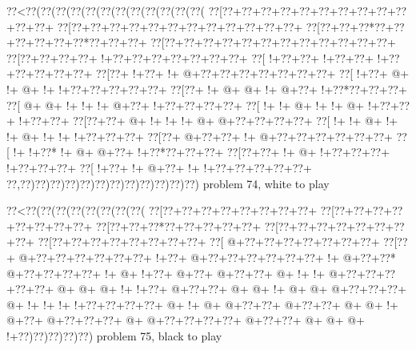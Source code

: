 \vbox{\vbox{\goo
\0??<\0??(\0??(\0??(\0??(\0??(\0??(\0??(\0??(\0??(\0??(\0??(\0??(
\0??[\0??+\0??+\0??+\0??+\0??+\0??+\0??+\0??+\0??+\0??+\0??+\0??+
\0??[\0??+\0??+\0??+\0??+\0??+\0??+\0??+\0??+\0??+\0??+\0??+\0??+
\0??[\0??+\0??+\0??*\0??+\0??+\0??+\0??+\0??+\0??*\0??+\0??+\0??+
\0??[\0??+\0??+\0??+\0??+\0??+\0??+\0??+\0??+\0??+\0??+\0??+\0??+
\0??[\0??+\0??+\0??+\0??+\- !+\0??+\0??+\0??+\0??+\0??+\0??+\0??+
\0??[\- !+\0??+\0??+\- !+\0??+\0??+\- !+\0??+\0??+\0??+\0??+\0??+
\0??[\0??+\- !+\0??+\- !+\- @+\0??+\0??+\0??+\0??+\0??+\0??+\0??+
\0??[\- !+\0??+\- @+\- !+\- @+\- !+\- !+\0??+\0??+\0??+\0??+\0??+
\0??[\0??+\- !+\- @+\- @+\- !+\- @+\0??+\- !+\0??*\0??+\0??+\0??+
\0??[\- @+\- @+\- !+\- !+\- !+\- @+\0??+\- !+\0??+\0??+\0??+\0??+
\0??[\- !+\- !+\- @+\- !+\- !+\- @+\- !+\0??+\0??+\- !+\0??+\0??+
\0??[\0??+\0??+\- @+\- !+\- !+\- !+\- @+\- @+\0??+\0??+\0??+\0??+
\0??[\- !+\- !+\- @+\- !+\- !+\- @+\- !+\- !+\- !+\0??+\0??+\0??+
\0??[\0??+\- @+\0??+\0??+\- !+\- @+\0??+\0??+\0??+\0??+\0??+\0??+
\0??[\- !+\- !+\0??*\- !+\- @+\- @+\0??+\- !+\0??*\0??+\0??+\0??+
\0??[\0??+\0??+\- !+\- @+\- !+\0??+\0??+\0??+\- !+\0??+\0??+\0??+
\0??[\- !+\0??+\- !+\- @+\0??+\- !+\- !+\0??+\0??+\0??+\0??+\0??+
\0??,\0??)\0??)\0??)\0??)\0??)\0??)\0??)\0??)\0??)\0??)\0??)\0??)
}
\hfil problem 74, white to play\hfil\break
}

\vbox{\vbox{\goo
\0??<\0??(\0??(\0??(\0??(\0??(\0??(\0??(\0??(
\0??[\0??+\0??+\0??+\0??+\0??+\0??+\0??+\0??+
\0??[\0??+\0??+\0??+\0??+\0??+\0??+\0??+\0??+
\0??[\0??+\0??+\0??*\0??+\0??+\0??+\0??+\0??+
\0??[\0??+\0??+\0??+\0??+\0??+\0??+\0??+\0??+
\0??[\0??+\0??+\0??+\0??+\0??+\0??+\0??+\0??+
\0??[\- @+\0??+\0??+\0??+\0??+\0??+\0??+\0??+
\0??[\0??+\- @+\0??+\0??+\0??+\0??+\0??+\0??+
\- !+\0??+\- @+\0??+\0??+\0??+\0??+\0??+\0??+
\- !+\- @+\0??+\0??*\- @+\0??+\0??+\0??+\0??+
\- !+\- @+\- !+\0??+\- @+\0??+\- @+\0??+\0??+
\- @+\- !+\- !+\- @+\0??+\0??+\0??+\0??+\0??+
\- @+\- @+\- @+\- !+\- !+\0??+\- @+\0??+\0??+
\- @+\- @+\- !+\- @+\- @+\- @+\0??+\0??+\0??+
\- @+\- !+\- !+\- !+\- !+\0??+\0??+\0??+\0??+
\- @+\- !+\- @+\- @+\0??+\0??+\- @+\0??+\0??+
\- @+\- @+\- !+\- @+\0??+\- @+\0??+\0??+\0??+
\- @+\- @+\0??+\0??+\0??+\0??+\- @+\0??+\0??+
\- @+\- @+\- @+\- !+\0??)\0??)\0??)\0??)\0??)
}
\hfil problem 75, black to play\hfil\break
}

